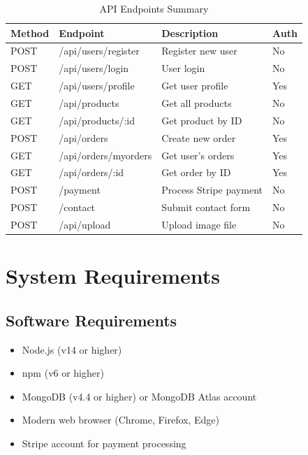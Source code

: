 \documentclass[12pt,a4paper]{article}
\begin{document}
\begin{table}[h!]
\centering
\begin{tabular}{@{}llll@{}}
\toprule
\textbf{Method} & \textbf{Endpoint} & \textbf{Description} & \textbf{Auth} \\
\midrule
POST & /api/users/register & Register new user & No \\
POST & /api/users/login & User login & No \\
GET & /api/users/profile & Get user profile & Yes \\
GET & /api/products & Get all products & No \\
GET & /api/products/:id & Get product by ID & No \\
POST & /api/orders & Create new order & Yes \\
GET & /api/orders/myorders & Get user's orders & Yes \\
GET & /api/orders/:id & Get order by ID & Yes \\
POST & /payment & Process Stripe payment & No \\
POST & /contact & Submit contact form & No \\
POST & /api/upload & Upload image file & No \\
\bottomrule
\end{tabular}
\caption{API Endpoints Summary}
\end{table}

\newpage
\section{System Requirements}

\subsection{Software Requirements}
\begin{itemize}
    \item Node.js (v14 or higher)
    \item npm (v6 or higher)
    \item MongoDB (v4.4 or higher) or MongoDB Atlas account
    \item Modern web browser (Chrome, Firefox, Edge)
    \item Stripe account for payment processing
\end{itemize}
\end{document}
